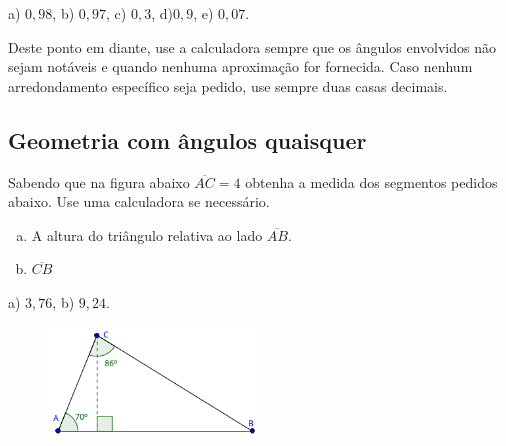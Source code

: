 \documentclass[main.tex]{subfiles}
\begin{document}
\begin{gabarito}
	\begin{gabaritoQuestao}
		a) $0,98$, b) $0,97$, c) $0,3$, d)$0,9$, e) $0,07$.
	\end{gabaritoQuestao}
\end{gabarito}

Deste ponto em diante, use a calculadora sempre que os ângulos envolvidos não sejam notáveis e quando nenhuma aproximação for fornecida. Caso nenhum arredondamento específico seja pedido, use sempre duas casas decimais.

\subsection*{Geometria com ângulos quaisquer}

\begin{questao}
 Sabendo que na figura abaixo $\overline{AC}=4$ obtenha a medida dos segmentos pedidos abaixo. Use uma calculadora se necessário.
\begin{enumerate}[a)]
\item A altura do triângulo relativa ao lado $\overline{AB}$.
\item $\overline{CB}$
\end{enumerate}
\end{questao}

\begin{gabarito}
	\begin{gabaritoQuestao}
		a) $3,76$, b) $9,24$.
	\end{gabaritoQuestao}
\end{gabarito}


\begin{figure}[h]
\centering
\includegraphics[width=0.5\textwidth]{./img/c4q3.png}
\end{figure}
\end{document}

